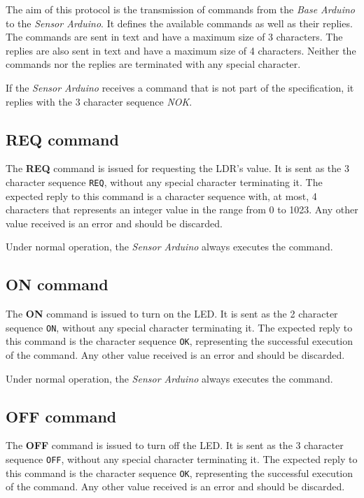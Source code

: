 \documentclass[conference, a4paper]{IEEEtran}
\begin{document}
The aim of this protocol is the transmission of commands from the \textit{Base Arduino} to the \textit{Sensor Arduino}. It defines the available commands as well as their replies. The commands are sent in text and have a maximum size of 3 characters. The replies are also sent in text and have a maximum size of 4 characters. Neither the commands nor the replies are terminated with any special character.

If the \textit{Sensor Arduino} receives a command that is not part of the specification, it replies with the 3 character sequence \textit{NOK}.

\subsection{REQ command}

The \textbf{REQ} command is issued for requesting the LDR's value. It is sent as the 3 character sequence \texttt{REQ}, without any special character terminating it. The expected reply to this command is a character sequence with, at most, 4 characters that represents an integer value in the range from 0 to 1023. Any other value received is an error and should be discarded.

Under normal operation, the \textit{Sensor Arduino} always executes the command.

\subsection{ON command}

The \textbf{ON} command is issued to turn on the LED. It is sent as the 2 character sequence \texttt{ON}, without any special character terminating it. The expected reply to this command is the character sequence \texttt{OK}, representing the successful execution of the command. Any other value received is an error and should be discarded.

Under normal operation, the \textit{Sensor Arduino} always executes the command.

\subsection{OFF command}

The \textbf{OFF} command is issued to turn off the LED. It is sent as the 3 character sequence \texttt{OFF}, without any special character terminating it. The expected reply to this command is the character sequence \texttt{OK}, representing the successful execution of the command. Any other value received is an error and should be discarded.
\end{document}
